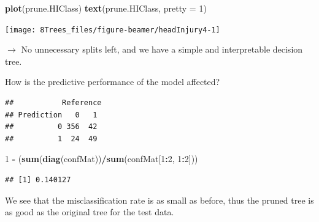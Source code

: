 \documentclass[10pt,ignorenonframetext,]{beamer}
\newenvironment{Shaded}{\begin{snugshade}}{\end{snugshade}}
\newcommand{\KeywordTok}[1]{\textcolor[rgb]{0.13,0.29,0.53}{\textbf{#1}}}
\newcommand{\DataTypeTok}[1]{\textcolor[rgb]{0.13,0.29,0.53}{#1}}
\newcommand{\DecValTok}[1]{\textcolor[rgb]{0.00,0.00,0.81}{#1}}
\newcommand{\StringTok}[1]{\textcolor[rgb]{0.31,0.60,0.02}{#1}}
\newcommand{\OperatorTok}[1]{\textcolor[rgb]{0.81,0.36,0.00}{\textbf{#1}}}
\newcommand{\NormalTok}[1]{#1}
\begin{document}
\begin{frame}[fragile]

\scriptsize

\begin{Shaded}
\begin{Highlighting}[]
\KeywordTok{plot}\NormalTok{(prune.HIClass)}
\KeywordTok{text}\NormalTok{(prune.HIClass, }\DataTypeTok{pretty =} \DecValTok{1}\NormalTok{)}
\end{Highlighting}
\end{Shaded}

\begin{center}\texttt{[image: 8Trees\_files/figure-beamer/headInjury4-1]} \end{center}

\normalsize
\(\rightarrow\) No unnecessary splits left, and we have a simple and
interpretable decision tree.

How is the predictive performance of the model affected?

\end{frame}

\begin{frame}[fragile]

\scriptsize

\begin{Shaded}
\end{Shaded}

\begin{verbatim}
##           Reference
## Prediction   0   1
##          0 356  42
##          1  24  49
\end{verbatim}

\begin{Shaded}
\begin{Highlighting}[]
\DecValTok{1} \OperatorTok{-}\StringTok{ }\NormalTok{(}\KeywordTok{sum}\NormalTok{(}\KeywordTok{diag}\NormalTok{(confMat))}\OperatorTok{/}\KeywordTok{sum}\NormalTok{(confMat[}\DecValTok{1}\OperatorTok{:}\DecValTok{2}\NormalTok{, }\DecValTok{1}\OperatorTok{:}\DecValTok{2}\NormalTok{]))}
\end{Highlighting}
\end{Shaded}

\begin{verbatim}
## [1] 0.140127
\end{verbatim}

\normalsize

We see that the misclassification rate is as small as before, thus the
pruned tree is as good as the original tree for the test data.

\end{frame}
\end{document}
